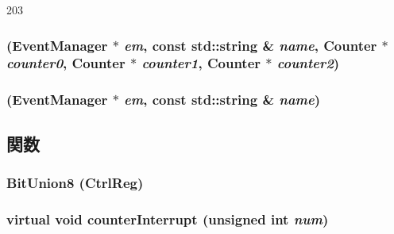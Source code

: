 \begin{DoxyCode}
203     {}
\end{DoxyCode}
\hypertarget{classIntel8254Timer_a33260f6578db0088fbdfa3d3dbcce9ba}{
\subsubsection[{Intel8254Timer}]{ ({\bf EventManager} $\ast$ {\em em}, \/  const std::string \& {\em name}, \/  {\bf Counter} $\ast$ {\em counter0}, \/  {\bf Counter} $\ast$ {\em counter1}, \/  {\bf Counter} $\ast$ {\em counter2})}}
\label{classIntel8254Timer_a33260f6578db0088fbdfa3d3dbcce9ba}
\hypertarget{classIntel8254Timer_a0805f3ad08a23ef608bb05d72d15c26e}{
\subsubsection[{Intel8254Timer}]{ ({\bf EventManager} $\ast$ {\em em}, \/  const std::string \& {\em name})}}
\label{classIntel8254Timer_a0805f3ad08a23ef608bb05d72d15c26e}


\subsection{関数}
\hypertarget{classIntel8254Timer_ac1f155872c59c72c493afcab2c4e5211}{
\subsubsection[{BitUnion8}]{\setlength{\rightskip}{0pt plus 5cm}BitUnion8 (CtrlReg)}}
\label{classIntel8254Timer_ac1f155872c59c72c493afcab2c4e5211}
\hypertarget{classIntel8254Timer_a3c6698d5809816aa5101e57421d910d5}{
\subsubsection[{counterInterrupt}]{\setlength{\rightskip}{0pt plus 5cm}virtual void counterInterrupt (unsigned int {\em num})}}
\label{classIntel8254Timer_a3c6698d5809816aa5101e57421d910d5}


